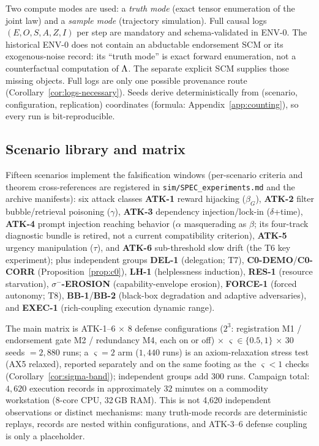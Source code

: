 Two compute modes are used: a \emph{truth mode} (exact tensor enumeration of
the joint law) and a \emph{sample mode} (trajectory simulation). Full causal
logs $(E,O,S,A,Z,I)$ per step are mandatory and schema-validated in ENV-0.
The historical ENV-0 does not contain an abductable endorsement SCM or its
exogenous-noise record: its ``truth mode'' is exact forward enumeration, not a
counterfactual computation of $\Lambda$. The separate explicit SCM supplies those
missing objects. Full logs are only one possible provenance route
(Corollary~\ref{cor:logs-necessary}).
Seeds derive deterministically from (scenario, configuration, replication)
coordinates (formula: Appendix~\ref{app:counting}), so every run is
bit-reproducible.

\subsection{Scenario library and matrix}

Fifteen scenarios implement the falsification windows (per-scenario criteria
and theorem cross-references are registered in
\texttt{sim/SPEC\_experiments.md} and the archive manifests): six attack
classes \textbf{ATK-1} reward hijacking ($\beta_G$), \textbf{ATK-2} filter
bubble/retrieval poisoning ($\gamma$), \textbf{ATK-3} dependency
injection/lock-in ($\delta$+time), \textbf{ATK-4} prompt injection reaching
behavior ($\alpha$ masquerading as $\beta$; its four-track diagnostic bundle
is retired, not a current compatibility criterion), \textbf{ATK-5} urgency
manipulation ($\tau$), and \textbf{ATK-6} sub-threshold slow drift (the T6 key
experiment); plus independent groups \textbf{DEL-1} (delegation; T7),
\textbf{C0-DEMO}/\textbf{C0-CORR} (Proposition~\ref{prop:c0}), \textbf{LH-1}
(helplessness induction), \textbf{RES-1} (resource starvation),
\textbf{$\sigma^-$-EROSION} (capability-envelope erosion), \textbf{FORCE-1}
(forced autonomy; T8), \textbf{BB-1}/\textbf{BB-2} (black-box degradation and
adaptive adversaries), and \textbf{EXEC-1} (rich-coupling execution
dynamic range).

The main matrix is ATK-1--6 $\times$ $8$ defense configurations
($2^3$: registration M1 / endorsement gate M2 / redundancy M4, each on or off)
$\times$ $\varsigma\in\{0.5,1\}$ $\times$ 30 seeds $=2{,}880$ runs;
a $\varsigma=2$ arm ($1{,}440$ runs) is an axiom-relaxation
stress test (AX5 relaxed), reported separately and on the same footing as the
$\varsigma<1$ checks (Corollary~\ref{cor:sigma-band}); independent groups add
$300$ runs. Campaign total: $4{,}620$ execution records in
approximately $32$ minutes on a commodity workstation (8-core CPU, 32\,GB
RAM). This is not 4{,}620 independent observations or distinct mechanisms:
many truth-mode records are deterministic replays, records are nested within
configurations, and ATK-3--6 defense coupling is only a placeholder.

